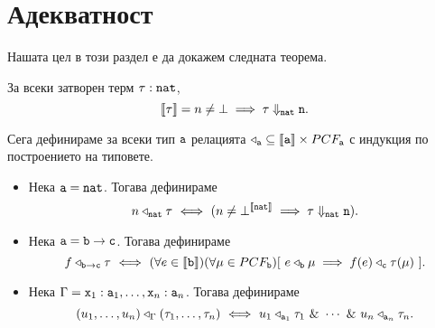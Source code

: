 \section{Адекватност}
Нашата цел в този раздел е да докажем следната теорема.
\begin{framed}
  \begin{theorem}
    За всеки затворен терм $\tau : \texttt{nat}$, 
    \[\llbracket{\tau}\rrbracket = n \neq \bot \implies \tau \Downarrow_{\texttt{nat}} \texttt{n}.\]
  \end{theorem}
\end{framed}


Сега дефинираме за всеки тип $\texttt{a}$ релацията 
$\triangleleft_{\texttt{a}} \subseteq \llbracket{\texttt{a}}\rrbracket \times PCF_{\texttt{a}}$
с индукция по построението на типовете.

\begin{itemize}
\item
  Нека $\texttt{a} = \texttt{nat}$. Тогава дефинираме
  \[n \triangleleft_{\texttt{nat}} \tau \ \Longleftrightarrow\  ( n\neq\bot^{\llbracket{\texttt{nat}}\rrbracket} \implies \tau \Downarrow_{\texttt{nat}} \texttt{n}).\]
\item
  Нека $\texttt{a} = \texttt{b} \to \texttt{c}$. Тогава дефинираме
  \[f \triangleleft_{\texttt{b}\to\texttt{c}} \tau \ \Longleftrightarrow\  (\forall e\in \llbracket{\texttt{b}}\rrbracket)(\forall \mu \in PCF_{\texttt{b}})[\ e \triangleleft_{\texttt{b}} \mu \implies f(e) \triangleleft_{\texttt{c}} \tau(\mu)\ ].\]
\item
  Нека $\Gamma = \texttt{x}_1:\texttt{a}_1, \dots, \texttt{x}_n:\texttt{a}_n$. Тогава дефинираме 
  \[(u_1,\dots,u_n) \triangleleft_\Gamma (\tau_1,\dots,\tau_n) \iff u_1 \triangleleft_{\vv{a}_1} \tau_1\ \&\ \cdots\ \&\ u_n \triangleleft_{\vv{a}_n} \tau_n.\]
\end{itemize}


